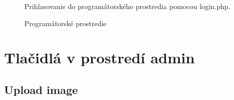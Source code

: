 \pagebreak

\begin{figure}[!tbh]
\centering
\setlength{\fboxsep}{0pt}%
\setlength{\fboxrule}{1pt}%
\caption{Prihlasovanie do programátorského prostredia pomocou login.php.}\label{OBRAZOK 1.8}
\end{figure}

\begin{figure}[!tbh]
\centering
\setlength{\fboxsep}{0pt}%
\setlength{\fboxrule}{1pt}%
\caption{Programátorské prostredie}\label{OBRAZOK 1.9}
\end{figure}

\pagebreak

\section{Tlačidlá v prostredí admin}
\subsection{Upload image}

